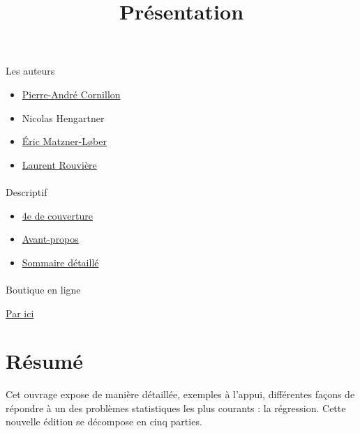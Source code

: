 \documentclass[
  letterpaper,
  DIV=11,
  numbers=noendperiod]{scrartcl}
\title{Présentation}
\author{}
\date{}
\makeatletter
\let\oldparagraph\paragraph
\renewcommand{\paragraph}{
    \@ifstar
      \xxxParagraphStar
      \xxxParagraphNoStar
  }
\newcommand{\xxxParagraphStar}[1]{\oldparagraph*{#1}\mbox{}}
\newcommand{\xxxParagraphNoStar}[1]{\oldparagraph{#1}\mbox{}}
\providecommand{\tightlist}{%
  \setlength{\itemsep}{0pt}\setlength{\parskip}{0pt}}\usepackage{longtable,booktabs,array}
\makeatother
\begin{document}
\maketitle


\paragraph{Les auteurs}\label{les-auteurs}

\begin{itemize}
\tightlist
\item
  \href{https://perso.univ-rennes2.fr/pierre-andre.cornillon}{Pierre-André
  Cornillon}
\item
  Nicolas Hengartner
\item
  \href{https://www.researchgate.net/profile/E-Matzner-Lober}{Éric
  Matzner-Løber}
\item
  \href{https://rouviere.pages.math.cnrs.fr}{Laurent Rouvière}
\end{itemize}

\paragraph{Descriptif}\label{descriptif}

\begin{itemize}
\tightlist
\item
  \href{quatriemeV3.pdf}{4e de couverture}
\item
  \href{avant-propos_V3.pdf}{Avant-propos}
\item
  \href{sommaire_v3.pdf}{Sommaire détaillé}
\end{itemize}

\paragraph{Boutique en ligne}\label{boutique-en-ligne}

\href{https://laboutique.edpsciences.fr/produit/1335/9782759831463/regression-avec-r}{Par
ici}

\section{Résumé}\label{ruxe9sumuxe9}

Cet ouvrage expose de manière détaillée, exemples à l'appui, différentes
façons de répondre à un des problèmes statistiques les plus courants :
la régression. Cette nouvelle édition se décompose en cinq parties.
\end{document}
